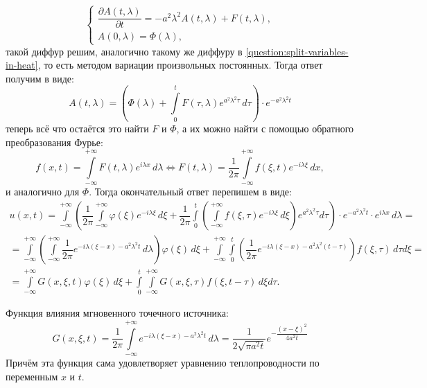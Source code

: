 \[
  \begin{cases}
    \dfrac{\partial A(t, \lambda)}{\partial t}
      = - a^2 \lambda^2 A(t, \lambda)
      + F(t, \lambda), \\
    A(0, \lambda) = \Phi(\lambda),
  \end{cases}
\]
такой диффур решим, аналогично такому же диффуру в \ref{question:split-variables-in-heat}, то
есть методом вариации произвольных постоянных. Тогда ответ получим в виде:
\[
  A(t, \lambda) = \left(
    \Phi(\lambda)
    + \int\limits_0^t F(\tau, \lambda) e^{a^2 \lambda^2 \tau} \, d\tau \right)
    \cdot e^{- a^2 \lambda^2 t}
\]
теперь всё что остаётся это найти $F$ и $\Phi$, а их можно найти с помощью обратного преобразования
Фурье:
\[
  f(x, t) = \int\limits_{-\infty}^{+\infty} F(t, \lambda) e^{i \lambda x} \, d\lambda
  \Leftrightarrow
  F(t, \lambda)
  = \dfrac{1}{2\pi} \int\limits_{-\infty}^{+\infty} f(\xi, t) e^{-i \lambda \xi} \, dx,
\]
и аналогично для $\Phi$. Тогда окончательный ответ перепишем в виде:
\begin{multline*}
  u(x, t) = \int\limits_{-\infty}^{+\infty}
    \left( \dfrac{1}{2\pi} \int\limits_{-\infty}^{+\infty} \varphi(\xi) e^{-i \lambda \xi} \, d\xi
      + \dfrac{1}{2\pi} \int\limits_0^t
      \left( \int\limits_{-\infty}^{+\infty} f(\xi, \tau) e^{-i \lambda \xi} \, d\xi \right)
      e^{a^2 \lambda^2 \tau} d\tau \right)
    \cdot e^{-a^2 \lambda^2 t} \cdot e^{i \lambda x} \, d\lambda = \\
  = \int\limits_{-\infty}^{+\infty}
    \left( \int\limits_{-\infty}^{+\infty}
      \dfrac{1}{2\pi} e^{-i\lambda (\xi-x) - a^2\lambda^2t} \, d\lambda \right) \varphi(\xi) \, d\xi
  + \int\limits_{-\infty}^{+\infty} \int\limits_{0}^{t}
    \left( \dfrac{1}{2\pi} e^{-i\lambda(\xi-x) - a^2\lambda^2(t - \tau)} \right)
    f(\xi, \tau) \, d\tau d\xi = \\
  = \int\limits_{-\infty}^{+\infty} G(x, \xi, t) \varphi(\xi) \, d\xi
    + \int\limits_0^t \int\limits_{-\infty}^{+\infty} G(x, \xi, \tau) f(\xi, t-\tau) \, d\xi d\tau.
\end{multline*}

Функция влияния мгновенного точечного источника:
\[
  G(x, \xi, t) = \dfrac{1}{2\pi} \int\limits_{-\infty}^{+\infty} e^{-i \lambda(\xi-x) - a^2 \lambda^2 t} \, d\lambda
  = \dfrac{1}{2\sqrt{\pi a^2 t}} e^{- \dfrac{(x-\xi)^2}{4 a^2 t}}
\]
Причём эта функция сама удовлетворяет уравнению теплопроводности по переменным $x$ и $t$.
  
